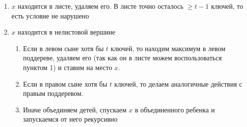 \begin{enumerate}
    \item $x$ находится в листе, удаляем его. В листе точно осталось $\geqslant t-1$ ключей, то есть условие не нарушено 
    \item $x$ находится в нелистовой вершине \begin{enumerate}
        \item Если в левом сыне хотя бы $t$ ключей, то находим максимум в левом поддереве, удаляем его (так как он в листе можем воспользоваться пунктом 1) и ставим на место $x$.
        \item Если в правом сыне хотя бы $t$ ключей, то делаем аналогичные действия с правым поддеревом.
        \item Иначе объединяем детей, спускаем $x$ в объединенного ребенка и запускаемся от него рекурсивно
    \end{enumerate}
\end{enumerate}
